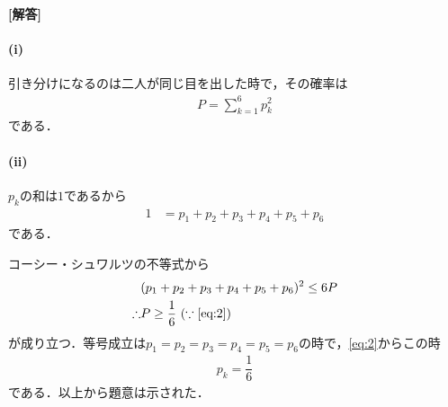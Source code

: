 \documentclass[../../main.tex]{subfiles}
\begin{document}
\begin{oframed}
  
\end{oframed}

{\bf [解答]}

\paragraph{(i)}

引き分けになるのは二人が同じ目を出した時で，その確率は
\begin{align}
  P = \sum_{k=1}^6 p_k^2 \label{eq:1}
\end{align}
である．

\paragraph{(ii)}

$p_k$の和は$1$であるから
\begin{align}
  1 &= p_1 + p_2 + p_3 + p_4 + p_5 + p_6 \label{eq:2}
\end{align}
である．

コーシー・シュワルツの不等式から
\begin{align}
  & (p_1+p_2+p_3+p_4+p_5+p_6)^2 \le 6P \\
  \therefore
  & P \ge \dfrac{1}{6} \ (\because \text{\cref{eq:2}})
\end{align}
が成り立つ．等号成立は$p_1 = p_2 = p_3 = p_4 = p_5 = p_6$の時で，\cref{eq:2}からこの時
\begin{align}
  p_k = \dfrac{1}{6}
\end{align}
である．以上から題意は示された．
\end{document}
